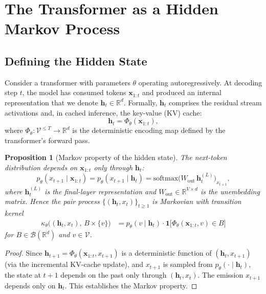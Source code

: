 \documentclass[11pt,a4paper]{article}
\theoremstyle{plain}
\newtheorem{proposition}[theorem]{Proposition}
\theoremstyle{definition}
\theoremstyle{remark}
\newcommand{\R}{\mathbb{R}}
\newcommand{\cB}{\mathcal{B}}
\newcommand{\softmax}{\mathrm{softmax}}
\newcommand{\vocab}{\mathcal{V}}
\newcommand{\ind}{\mathbf{1}}
\begin{document}
\section{The Transformer as a Hidden Markov Process}\label{sec:hmm}

\subsection{Defining the Hidden State}

Consider a transformer with parameters $\theta$ operating autoregressively.
At decoding step $t$, the model has consumed tokens $\bm{x}_{1:t}$ and
produced an internal representation that we denote $\bm{h}_t \in \R^d$.
Formally, $\bm{h}_t$ comprises the residual stream activations and, in
cached inference, the key-value (KV) cache:
\[
  \bm{h}_t = \Phi_\theta(\bm{x}_{1:t}),
\]
where $\Phi_\theta: \vocab^{\leq T} \to \R^d$ is the deterministic encoding
map defined by the transformer's forward pass.

\begin{proposition}[Markov property of the hidden state]\label{prop:markov}
The next-token distribution depends on $\bm{x}_{1:t}$ \emph{only through}
$\bm{h}_t$:
\[
  p_\theta(x_{t+1} \mid \bm{x}_{1:t})
  = p_\theta(x_{t+1} \mid \bm{h}_t)
  = \softmax\!\bigl(W_{\mathrm{out}}\, \bm{h}_t^{(L)}\bigr)_{x_{t+1}},
\]
where $\bm{h}_t^{(L)}$ is the final-layer representation and $W_{\mathrm{out}}
\in \R^{V \times d}$ is the unembedding matrix. Hence the pair process
$\{(\bm{h}_t, x_t)\}_{t \geq 1}$ is Markovian with transition kernel
\begin{align}
  \kappa_\theta\bigl((\bm{h}_t, x_t),\, B \times \{v\}\bigr)
  &= p_\theta(v \mid \bm{h}_t)\cdot
     \ind\!\bigl[\Phi_\theta(\bm{x}_{1:t}, v) \in B\bigr]
     \label{eq:kernel}
\end{align}
for $B \in \cB(\R^d)$ and $v \in \vocab$.
\end{proposition}

\begin{proof}
Since $\bm{h}_{t+1} = \Phi_\theta(\bm{x}_{1:t}, x_{t+1})$ is a deterministic
function of $(\bm{h}_t, x_{t+1})$ (via the incremental KV-cache update), and
$x_{t+1}$ is sampled from $p_\theta(\cdot \mid \bm{h}_t)$, the state at
$t+1$ depends on the past only through $(\bm{h}_t, x_t)$. The emission
$x_{t+1}$ depends only on $\bm{h}_t$. This establishes the Markov property.
\end{proof}
\end{document}
